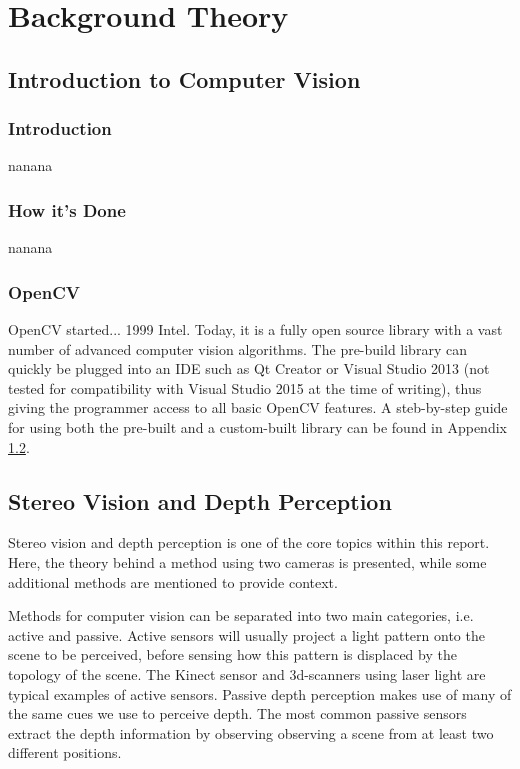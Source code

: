 \chapter{Background Theory}

\section{Introduction to Computer Vision}

\subsection{Introduction}
nanana

\subsection{How it's Done}
nanana

\subsection{OpenCV}

OpenCV started... 1999 Intel. Today, it is a fully open source library with a vast number of advanced computer vision algorithms. The pre-build library can quickly be plugged into  an IDE such as Qt Creator or Visual Studio 2013 (not tested for compatibility with Visual Studio 2015 at the time of writing), thus giving the programmer access to all basic OpenCV features. A steb-by-step guide for using both the pre-built and a custom-built library can be found in Appendix \ref{}.

\section{Stereo Vision and Depth Perception}

Stereo vision and depth perception is one of the core topics within this report. Here, the theory behind a method using two cameras is presented, while some additional methods are mentioned to provide context.

Methods for computer vision can be separated into two main categories, i.e. active and passive. Active sensors will usually project a light pattern onto the scene to be perceived, before sensing how this pattern is displaced by the topology of the scene. The Kinect sensor and 3d-scanners using laser light are typical examples of active sensors. Passive depth perception makes use of many of the same cues we use to perceive depth. The most common passive sensors extract the depth information by observing observing a scene from at least two different positions. 

